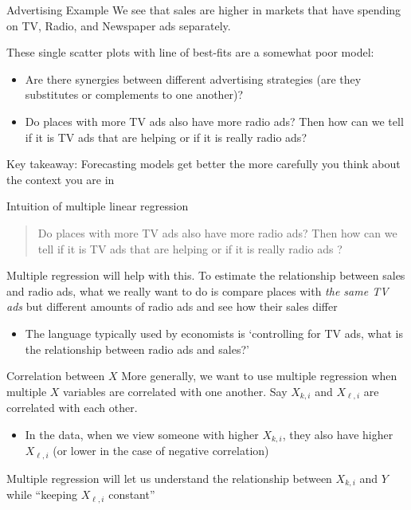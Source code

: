 \documentclass[aspectratio=169,t,11pt,table]{beamer}
\begin{document}
\begin{frame}{Advertising Example}
  We see that sales are higher in markets that have spending on TV, Radio, and Newspaper ads separately. 
  
  \pause
  \bigskip 
  These single scatter plots with line of best-fits are a somewhat poor model:
  \begin{itemize}
    \item Are there synergies between different advertising strategies (are they substitutes or complements to one another)?
    \item Do places with more TV ads also have more radio ads? Then how can we tell if it is TV ads that are helping or if it is really radio ads?
  \end{itemize}

  \pause\bigskip
  \alert{Key takeaway:} Forecasting models get better the more carefully you think about the context you are in
\end{frame}

\begin{frame}{Intuition of multiple linear regression}
  \begin{quote}
    Do places with more TV ads also have more radio ads? Then how can we tell if it is TV ads that are helping or if it is really radio ads ?
  \end{quote}

  \bigskip
  Multiple regression will help with this. To estimate the relationship between sales and radio ads, what we really want to do is compare places with \emph{the same TV ads} but different amounts of radio ads and see how their sales differ

  \pause
  \begin{itemize}
    \item The language typically used by economists is `controlling for TV ads, what is the relationship between radio ads and sales?'
  \end{itemize}
\end{frame}

\begin{frame}{Correlation between $X$}
  More generally, we want to use multiple regression when multiple $X$ variables are correlated with one another. Say $X_{k,i}$ and $X_{\ell,i}$ are correlated with each other.
  \begin{itemize}
    \item In the data, when we view someone with higher $X_{k,i}$, they also have higher $X_{\ell,i}$ (or lower in the case of negative correlation)
  \end{itemize}

  \pause
  \bigskip
  Multiple regression will let us understand the relationship between $X_{k,i}$ and $Y$ while ``keeping $X_{\ell,i}$ constant''
\end{frame}
\end{document}

